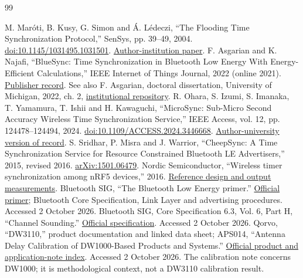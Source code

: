 \documentclass[11pt,letterpaper]{article}
\begin{document}
\begin{thebibliography}{99}\small\raggedright
{} M. Mar\'oti, B. Kusy, G. Simon and \'A. L\'edeczi, ``The Flooding Time Synchronization Protocol,'' SenSys, pp. 39--49, 2004. \href{https://doi.org/10.1145/1031495.1031501}{doi:10.1145/1031495.1031501}. \href{https://archive.isis.vanderbilt.edu/sites/default/files/Maroti_M_11_3_2004_The_Floodi.pdf}{Author-institution paper}.
 F. Asgarian and K. Najafi, ``BlueSync: Time Synchronization in Bluetooth Low Energy With Energy-Efficient Calculations,'' IEEE Internet of Things Journal, 2022 (online 2021). \href{https://ieeexplore.ieee.org/document/9555832/}{Publisher record}. See also F. Asgarian, doctoral dissertation, University of Michigan, 2022, ch. 2, \href{https://deepblue.lib.umich.edu/handle/2027.42/174171}{institutional repository}.
 R. Ohara, S. Izumi, S. Imanaka, T. Yamamura, T. Ishii and H. Kawaguchi, ``MicroSync: Sub-Micro Second Accuracy Wireless Time Synchronization Service,'' IEEE Access, vol. 12, pp. 124478--124494, 2024. \href{https://doi.org/10.1109/ACCESS.2024.3446668}{doi:10.1109/ACCESS.2024.3446668}. \href{https://da.lib.kobe-u.ac.jp/da/kernel/0100491658/0100491658.pdf}{Author-university version of record}.
 S. Sridhar, P. Misra and J. Warrior, ``CheepSync: A Time Synchronization Service for Resource Constrained Bluetooth LE Advertisers,'' 2015, revised 2016. \href{https://arxiv.org/abs/1501.06479}{arXiv:1501.06479}.
 Nordic Semiconductor, ``Wireless timer synchronization among nRF5 devices,'' 2016. \href{https://devzone.nordicsemi.com/guides/short-range-guides/b/bluetooth-low-energy/posts/wireless-timer-synchronization-among-nrf5-devices}{Reference design and output measurements}.
 Bluetooth SIG, ``The Bluetooth Low Energy primer.'' \href{https://www.bluetooth.com/bluetooth-le-primer/}{Official primer}; Bluetooth Core Specification, Link Layer and advertising procedures. Accessed 2 October 2026.
 Bluetooth SIG, Core Specification 6.3, Vol. 6, Part H, ``Channel Sounding.'' \href{https://www.bluetooth.com/wp-content/uploads/Files/Specification/HTML/Core_v6.3/out/en/low-energy-controller/channel-sounding.html}{Official specification}. Accessed 2 October 2026.
 Qorvo, ``DW3110,'' product documentation and linked data sheet; APS014, ``Antenna Delay Calibration of DW1000-Based Products and Systems.'' \href{https://www.qorvo.com/products/p/DW3110}{Official product and application-note index}. Accessed 2 October 2026. The calibration note concerns DW1000; it is methodological context, not a DW3110 calibration result.

\end{thebibliography}
\end{document}
